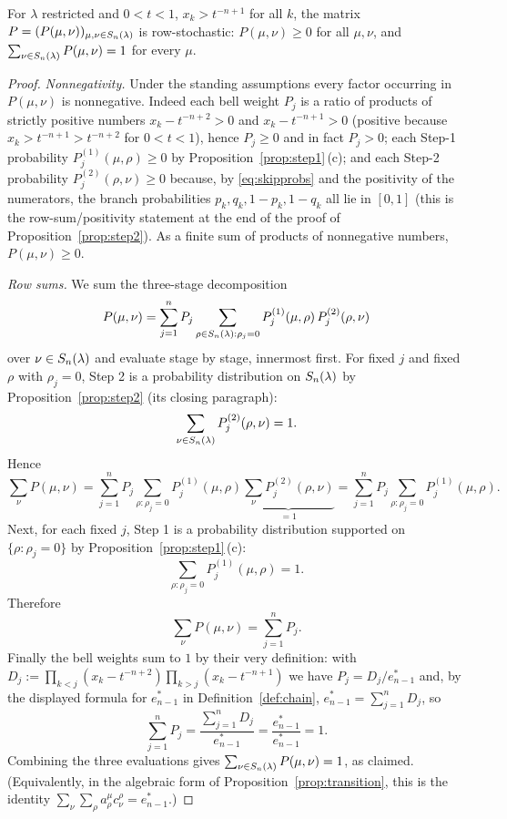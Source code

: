 \begin{qthreecorollary}\label{cor:stochastic}
For $\lambda$ restricted and $0<t<1$, $x_k>t^{-n+1}$ for all $k$, the matrix
$P=(P(\mu,\nu))_{\mu,\nu\in S_n(\lambda)}$ is row-stochastic:
$P(\mu,\nu)\ge0$ for all $\mu,\nu$, and $\sum_{\nu\in S_n(\lambda)}P(\mu,\nu)=1$ for
every $\mu$.
\end{qthreecorollary}

\begin{proof}
\emph{Nonnegativity.} Under the standing assumptions every factor occurring in
$P(\mu,\nu)$ is nonnegative. Indeed each bell weight $P_j$ is a ratio of products
of strictly positive numbers $x_k-t^{-n+2}>0$ and $x_k-t^{-n+1}>0$ (positive
because $x_k>t^{-n+1}>t^{-n+2}$ for $0<t<1$), hence $P_j\ge0$ and in fact
$P_j>0$; each Step-1 probability $P^{(1)}_j(\mu,\rho)\ge0$ by
Proposition~\ref{prop:step1}\,(c); and each Step-2 probability
$P^{(2)}_j(\rho,\nu)\ge0$ because, by \eqref{eq:skipprobs} and the positivity of
the numerators, the branch probabilities $p_k,q_k,1-p_k,1-q_k$ all lie in $[0,1]$
(this is the row-sum/positivity statement at the end of the proof of
Proposition~\ref{prop:step2}). As a finite sum of products of nonnegative numbers,
$P(\mu,\nu)\ge0$.

\smallskip
\emph{Row sums.} We sum the three-stage decomposition
\[
P(\mu,\nu)=\sum_{j=1}^n P_j\sum_{\rho\in S_n(\lambda):\rho_j=0}
P^{(1)}_j(\mu,\rho)\,P^{(2)}_j(\rho,\nu)
\]
over $\nu\in S_n(\lambda)$ and evaluate stage by stage, innermost first. For fixed
$j$ and fixed $\rho$ with $\rho_j=0$, Step 2 is a probability distribution on
$S_n(\lambda)$ by Proposition~\ref{prop:step2} (its closing paragraph):
\[
\sum_{\nu\in S_n(\lambda)}P^{(2)}_j(\rho,\nu)=1 .
\]
Hence
\[
\sum_{\nu}P(\mu,\nu)
=\sum_{j=1}^n P_j\sum_{\rho:\rho_j=0}P^{(1)}_j(\mu,\rho)
 \underbrace{\sum_{\nu}P^{(2)}_j(\rho,\nu)}_{=1}
=\sum_{j=1}^n P_j\sum_{\rho:\rho_j=0}P^{(1)}_j(\mu,\rho) .
\]
Next, for each fixed $j$, Step 1 is a probability distribution supported on
$\{\rho:\rho_j=0\}$ by Proposition~\ref{prop:step1}\,(c):
\[
\sum_{\rho:\rho_j=0}P^{(1)}_j(\mu,\rho)=1 .
\]
Therefore
\[
\sum_{\nu}P(\mu,\nu)=\sum_{j=1}^n P_j .
\]
Finally the bell weights sum to $1$ by their very definition: with
$D_j:=\prod_{k<j}(x_k-t^{-n+2})\prod_{k>j}(x_k-t^{-n+1})$ we have
$P_j=D_j/e^*_{n-1}$ and, by the displayed formula for $e^*_{n-1}$ in
Definition~\ref{def:chain}, $e^*_{n-1}=\sum_{j=1}^n D_j$, so
\[
\sum_{j=1}^n P_j=\frac{\sum_{j=1}^n D_j}{e^*_{n-1}}=\frac{e^*_{n-1}}{e^*_{n-1}}=1 .
\]
Combining the three evaluations gives $\sum_{\nu\in S_n(\lambda)}P(\mu,\nu)=1$, as
claimed. (Equivalently, in the algebraic form of
Proposition~\ref{prop:transition}, this is the identity
$\sum_\nu\sum_\rho a^\mu_\rho c^\rho_\nu=e^*_{n-1}$.)
\end{proof}

